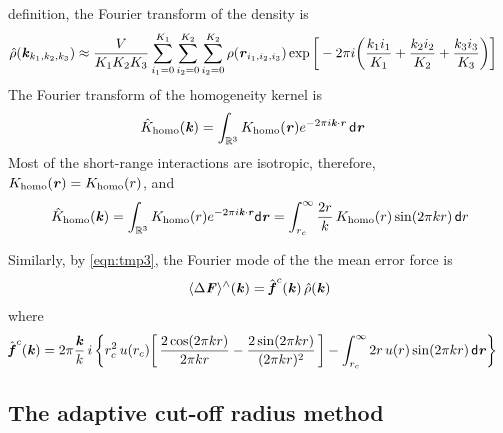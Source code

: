 \documentclass[aps,pre,preprint]{revtex4}
\renewcommand{\v}[1]{\textbf{\textit{#1}}}
\renewcommand{\d}[1]{\textsf{#1}}
\begin{document}
definition, the Fourier transform of the density is
\begin{align}
  \hat\rho(\v k_{k_1,k_2,k_3})
  & \approx
  \frac{V}{K_1K_2K_3}
  \sum_{i_1=0}^{K_1}\sum_{i_2=0}^{K_2}\sum_{i_2=0}^{K_2}
  \rho(\v r_{i_1,i_2,i_3})
  \exp\bigg[
  -2\pi i\bigg(
  \frac{k_1i_1}{K_1} + \frac{k_2i_2}{K_2} + \frac{k_3i_3}{K_3}
  \bigg)
  \bigg]
\end{align}
The Fourier transform of the homogeneity kernel is 
\begin{align}
  \hat K_{\textrm{homo}}(\v k)
  &=
  \int_{\mathbb R^3}K_{\textrm{homo}}(\v r)e^{-2\pi i\v k\cdot\v r}\,\d d\v r
\end{align}
Most of the short-range interactions are isotropic, therefore,
$K_{\textrm{homo}}(\v r) = K_{\textrm{homo}}(r)$, and
\begin{align}
  \hat{K}_{\textrm{homo}}(\v k)
  =
  \int_{\mathbb R^3}K_{\textrm{homo}}(r)e^{-2\pi i\v k\cdot\v r}\d d\v r
  =
  \int_{r_c}^\infty \frac{2 r}k\, K_{\textrm{homo}}(r) \sin(2\pi kr)\,\d dr
\end{align}


Similarly, by \eqref{eqn:tmp3}, the Fourier mode of the the mean error
force is
\begin{align}\label{eqn:tmp17}
  \langle\Delta\v F\rangle^\wedge(\v k) =
  \hat{\v f}^c(\v k)\,
  \hat\rho(\v k)
\end{align}
where 
\begin{align}\label{eqn:tmp18}
  \hat{\v f}^c(\v k) 
  & = 
  2\pi\frac{\v k}k\, i\,
  \bigg\{
  r_c^2\,u(r_c)
  \bigg[\,
  \frac{2\cos(2\pi kr)}{2\pi kr}
  -\frac{2\sin(2\pi kr)}{(2\pi kr)^2}
  \,\bigg] 
  -
  \int_{r_c}^\infty 2r\,u(r)\sin(2\pi kr)\,\d d\v r
  \bigg\}
\end{align}


\subsection{The adaptive cut-off radius method}

\end{document}
